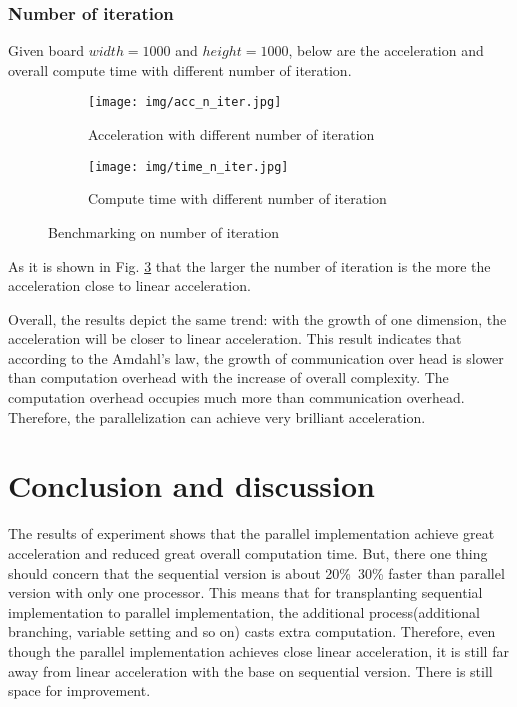 \documentclass[sigchi]{acmart}
\begin{document}
\subsubsection{Number of iteration}

Given board $width=1000$ and $height=1000$, below are the acceleration and overall compute time with different number of iteration.
\begin{figure}[H]
  \begin{subfigure}[b]{0.45\textwidth}
      \texttt{[image: img/acc\_n\_iter.jpg]}
      \caption{Acceleration with different number of iteration}
      \label{fig:acc_n_iter}
  \end{subfigure}
  \begin{subfigure}[b]{0.45\textwidth}
    \texttt{[image: img/time\_n\_iter.jpg]}
    \caption{Compute time with different number of iteration}
    \label{fig:time_n_iter}
  \end{subfigure}
  \caption{Benchmarking on number of iteration}
  \label{fig:n_iter}
\end{figure}


As it is shown in Fig. \ref{fig:n_iter} that the larger the number of iteration is the more the acceleration close to linear acceleration.

Overall, the results depict the same trend: with the growth of one dimension, the acceleration will be closer to linear acceleration.
This result indicates that according to the Amdahl's law, the growth of communication over head is slower than computation overhead with the increase of overall complexity.
The computation overhead occupies much more than communication overhead. Therefore, the parallelization can achieve very brilliant acceleration.

\section{Conclusion and discussion}

The results of experiment shows that the parallel implementation achieve great acceleration and reduced great overall computation time.
But, there one thing should concern that the sequential version is about 20\%~30\% faster than parallel version with only one processor.
This means that for transplanting sequential implementation to parallel implementation, the additional process(additional branching, variable setting and so on) casts extra computation.
Therefore, even though the parallel implementation achieves close linear acceleration, it is still far away from linear acceleration with the base on sequential version.
There is still space for improvement.
\end{document}
